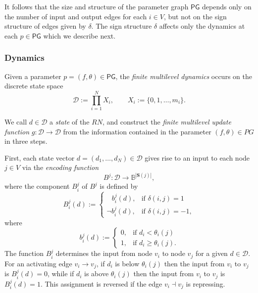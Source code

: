 \documentclass[12pt, notitlepage]{amsart}
\theoremstyle{definition}
\newcommand{\Sources}{\mathbf{S}}
\newcommand{\PG}{\mathsf{PG}}
\newcommand{\bbB}{\mathbb{B}}
\begin{document}
  It follows that the size and structure of the parameter graph $\PG$ depends only on the number of input and output edges for each $i \in V$, but not on the sign structure of edges given by $\delta$. The sign structure $\delta$ affects only the dynamics at each $p \in \PG$ which we describe next.

  \subsubsection{Dynamics}
  \label{sec:dynamics}

  Given a parameter $p = (f, \theta) \in \PG$, the \emph{finite multilevel dynamics} occurs on the discrete state space
  \[
    \mathcal{D} := \prod_{i = 1}^N X_i, \qquad X_i:= \{0, 1, \ldots, m_i\}.
  \]

  We call $d \in \mathcal D$ a \textit{state} of the $RN$, and construct the \textit{finite multilevel update function} $g \colon \mathcal{D} \to \mathcal{D}$ from the information contained in the parameter $(f, \theta) \in PG$ in three steps.

  First, each state vector $d = (d_1, \ldots, d_N) \in \mathcal{D}$ gives rise to an input to each node $j \in V$ via the \textit{encoding function}
  \begin{equation}
    \label{def:B}
    B^j \colon \mathcal{D} \to \bbB^{|\Sources(j)|},
  \end{equation}
  where the component $B_i^j$ of $B^j$ is defined by
  \[
    B_i^j(d) :=
    \begin{cases}
      \;\;\, b_i^j(d), & \text{if } \delta(i, j) = 1 \\
      \neg b_i^j(d),   & \text{if } \delta(i, j) = -1,
    \end{cases}
  \]
  where
  \[
    b_i^j(d) :=
    \begin{cases}
      0, & \text{if } d_i < \theta_i(j) \\
      1, & \text{if } d_i \geq \theta_i(j).
    \end{cases}
  \]
  The function $B_i^j$ determines the input from node $v_i$ to node $v_j$ for a given $d \in \mathcal{D}$. For an activating edge $v_i \to v_j$, if $d_i$ is below $\theta_i(j)$ then the input from $v_i$ to $v_j$ is $B_i^j(d) = 0$, while if $d_i$ is above $\theta_i(j)$ then the input from $v_i$ to $v_j$ is $B_i^j(d) = 1$. This assignment is reversed if the edge $v_i \dashv v_j$ is repressing.
\end{document}
